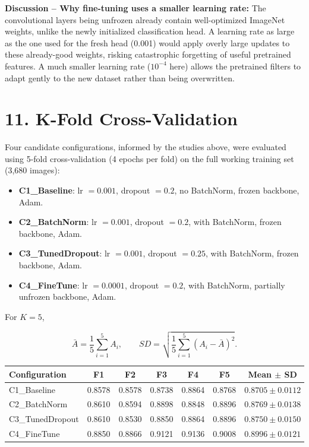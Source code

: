 \documentclass[10pt]{article}
\begin{document}
\textbf{Discussion -- Why fine-tuning uses a smaller learning rate:}
The convolutional layers being unfrozen already contain well-optimized
ImageNet weights, unlike the newly initialized classification head. A
learning rate as large as the one used for the fresh head (0.001) would
apply overly large updates to these already-good weights, risking
catastrophic forgetting of useful pretrained features. A much smaller
learning rate ($10^{-4}$ here) allows the pretrained filters to adapt
gently to the new dataset rather than being overwritten.

\section*{11. K-Fold Cross-Validation}

Four candidate configurations, informed by the studies above, were
evaluated using 5-fold cross-validation (4 epochs per fold) on the full
working training set (3{,}680 images):

\begin{itemize}
\item \textbf{C1\_Baseline}: lr $=0.001$, dropout $=0.2$, no BatchNorm, frozen backbone, Adam.
\item \textbf{C2\_BatchNorm}: lr $=0.001$, dropout $=0.2$, with BatchNorm, frozen backbone, Adam.
\item \textbf{C3\_TunedDropout}: lr $=0.001$, dropout $=0.25$, with BatchNorm, frozen backbone, Adam.
\item \textbf{C4\_FineTune}: lr $=0.0001$, dropout $=0.2$, with BatchNorm, partially unfrozen backbone, Adam.
\end{itemize}

For $K=5$,

\[
\bar{A}=
\frac{1}{5}\sum_{i=1}^{5}A_i,
\qquad
SD=
\sqrt{
\frac{1}{5}
\sum_{i=1}^{5}(A_i-\bar{A})^2
}.
\]

\begin{center}
\begin{tabular}{|l|c|c|c|c|c|c|}
\hline
Configuration & F1 & F2 & F3 & F4 & F5 & Mean $\pm$ SD\\
\hline
C1\_Baseline     & 0.8578 & 0.8578 & 0.8738 & 0.8864 & 0.8768 & $0.8705 \pm 0.0112$\\
C2\_BatchNorm    & 0.8610 & 0.8594 & 0.8898 & 0.8848 & 0.8896 & $0.8769 \pm 0.0138$\\
C3\_TunedDropout & 0.8610 & 0.8530 & 0.8850 & 0.8864 & 0.8896 & $0.8750 \pm 0.0150$\\
C4\_FineTune     & 0.8850 & 0.8866 & 0.9121 & 0.9136 & 0.9008 & $\mathbf{0.8996 \pm 0.0121}$\\
\hline
\end{tabular}
\end{center}
\end{document}
